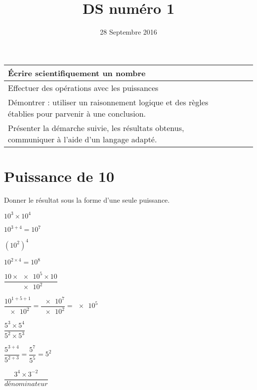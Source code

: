 \documentclass[a4paper,11pt]{exam}
\date{28 Septembre 2016}
\title{DS num\'ero 1}
\makeatletter
\def\maketitle{%
	\par\centering\Huge\textbf{\@title}%
	\par}
\makeatother
\begin{document}
	
	\maketitle

\begin{small}
\begin{center}
	\begin{tabular}{|@{\ }l@{}|@{\ }c@{\ }|}
		\hline
		\'Ecrire scientifiquement un nombre &  \ \ \ \\
		\hline
		Effectuer des opérations avec les puissances &  \\
		\hline
		Démontrer : utiliser un raisonnement logique et des règles établies pour parvenir à une conclusion. &  \\
		\hline
		Présenter la démarche suivie, les résultats obtenus, communiquer à l’aide d’un langage adapté. &  \\
		\hline
	\end{tabular}
\end{center}
\end{small}	
	

\section{Puissance de 10}

Donner le résultat sous la forme d'une seule puissance.


\begin{questions}
	\question $10^3 \times 10^4$
	
	\begin{solution}
		$10^{3+4} = 10^7$
	\end{solution}
	
	\question $(10^2)^4$
	
	\begin{solution}
		$10^{2 \times 4} = 10^8$
	\end{solution}
	
	\question  $\dfrac{10 \times \num{e5} \times \num{10}}{\num{e2}} $
	\begin{solution}
		$\dfrac{10^{1+5+1}}{\num{e2}}=\dfrac{\num{e7}}{\num{e2}}=\num{e5}$
	\end{solution}
	
	\question $\dfrac{5^3 \times 5^4}{5^2 \times 5^3}$
	\begin{solution}
		$\dfrac{5^{3+4}}{5^{2+3}} = \dfrac{5^7}{5^5} = 5^2$
	\end{solution}
	
	\question $\dfrac{3^{4} \times 3^{-2}}{dénominateur}$
\end{questions}
	
\end{document}
